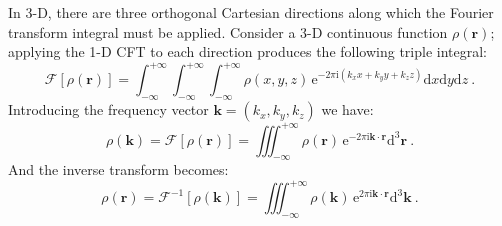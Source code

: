 In 3-D, there are three orthogonal Cartesian directions along which the Fourier transform integral must be applied.  Consider a 3-D continuous function $\rho(\mathbf{r})$; applying the 1-D CFT to each direction produces the following triple integral:
\[
	\mathcal{F}[\rho(\mathbf{r})] = \int_{-\infty}^{+\infty}\!\!\!\!\int_{-\infty}^{+\infty}\!\!\!\!\int_{-\infty}^{+\infty}\rho(x,y,z)\, \mathrm{e}^{-2\pi\mathrm{i}(k_xx+k_yy+k_zz)}\mathrm{d}x\mathrm{d}y\mathrm{d}z\ .
\]
Introducing the frequency vector $\mathbf{k}=(k_x,k_y,k_z)$ we have:
\begin{equation}
	\rho(\mathbf{k})=\mathcal{F}[\rho(\mathbf{r})] = \iiint_{-\infty}^{+\infty}\!\!\!\! \rho(\mathbf{r})\, \mathrm{e}^{-2\pi\mathrm{i}\mathbf{k}\cdot\mathbf{r}}\mathrm{d}^3\mathbf{r}\ .\label{\chabbr:eq:3DCFT}
\end{equation}
And the inverse transform becomes:
\begin{equation}
	\rho(\mathbf{r})=\mathcal{F}^{-1}[\rho(\mathbf{k})] = \iiint_{-\infty}^{+\infty}\!\!\!\! \rho(\mathbf{k})\, \mathrm{e}^{2\pi\mathrm{i}\mathbf{k}\cdot\mathbf{r}}\mathrm{d}^3\mathbf{k}\ .\label{\chabbr:eq:3DICFT}
\end{equation}

